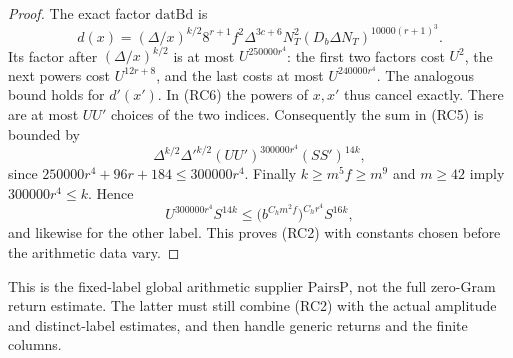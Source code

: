 \begin{proof}
The exact factor \(\mathrm{datBd}\) is
\[
 d(x)=(\Delta/x)^{k/2}
 8^{r+1}f^2\Delta^{3c+6}N_T^2
             (D_b\Delta N_T)^{10000(r+1)^3}.
\]
Its factor after \((\Delta/x)^{k/2}\) is at most
\(U^{250000r^4}\): the first two factors cost
\(U^2\), the next powers cost \(U^{12r+8}\),
and the last costs at most \(U^{240000r^4}\).
The analogous bound holds for \(d'(x')\).
In (RC6) the powers of \(x,x'\) thus cancel exactly.
There are at most \(UU'\) choices of the two indices.
Consequently the sum in (RC5) is bounded by
\[
 \Delta^{k/2}\Delta'^{k/2}
       (UU')^{300000r^4}(SS')^{14k},
\]
since \(250000r^4+96r+184\le300000r^4\).
Finally \(k\ge m^5 f\ge m^9\) and \(m\ge42\)
imply \(300000r^4\le k\). Hence
\[
 U^{300000r^4}S^{14k}
 \le \bigl(b^{C_h m^2 f}\bigr)^{C_h r^4}S^{16k},
\]
and likewise for the other label. This proves (RC2)
with constants chosen before the arithmetic data vary.
\end{proof}

This is the fixed-label global arithmetic supplier
\(\mathrm{PairsP}\), not the full zero-Gram return
estimate. The latter must still combine (RC2) with
the actual amplitude and distinct-label estimates,
and then handle generic returns and the finite columns.
